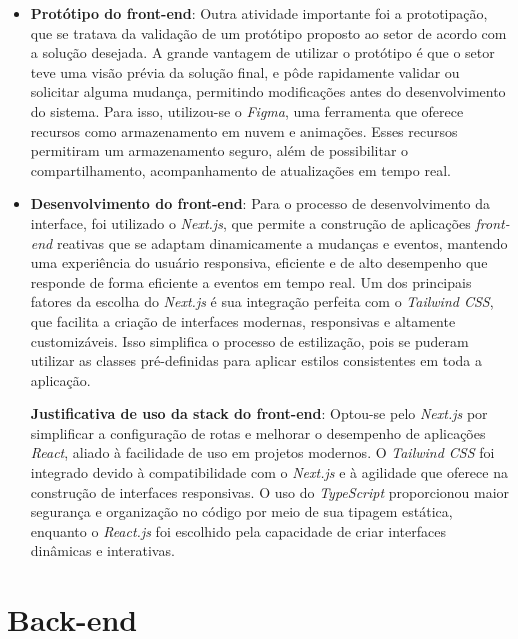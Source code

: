 \begin{itemize}
    \item \textbf{Protótipo do front-end}: Outra atividade importante foi a prototipação, que se tratava da validação de um protótipo proposto ao setor de acordo com a solução desejada. A grande vantagem de utilizar o protótipo é que o setor teve uma visão prévia da solução final, e pôde rapidamente validar ou solicitar alguma mudança, permitindo modificações antes do desenvolvimento do sistema. Para isso, utilizou-se o \textit{Figma}, uma ferramenta que oferece recursos como armazenamento em nuvem e animações. Esses recursos permitiram um armazenamento seguro, além de possibilitar o compartilhamento, acompanhamento de atualizações em tempo real.
    
    \item \textbf{Desenvolvimento do front-end}: Para o processo de desenvolvimento da interface, foi utilizado o \textit{Next.js}, que permite a construção de aplicações \textit{front-end} reativas que se adaptam dinamicamente a mudanças e eventos, mantendo uma experiência do usuário responsiva, eficiente e de alto desempenho que responde de forma eficiente a eventos em tempo real. Um dos principais fatores da escolha do \textit{Next.js} é sua integração perfeita com o \textit{Tailwind CSS}, que facilita a criação de interfaces modernas, responsivas e altamente customizáveis. Isso simplifica o processo de estilização, pois se puderam utilizar as classes pré-definidas para aplicar estilos consistentes em toda a aplicação.
    
    \textbf{Justificativa de uso da stack do front-end}: Optou-se pelo \textit{Next.js} por simplificar a configuração de rotas e melhorar o desempenho de aplicações \textit{React}, aliado à facilidade de uso em projetos modernos. O \textit{Tailwind CSS} foi integrado devido à compatibilidade com o \textit{Next.js} e à agilidade que oferece na construção de interfaces responsivas. O uso do \textit{TypeScript} proporcionou maior segurança e organização no código por meio de sua tipagem estática, enquanto o \textit{React.js} foi escolhido pela capacidade de criar interfaces dinâmicas e interativas.
\end{itemize}

\section{Back-end}

